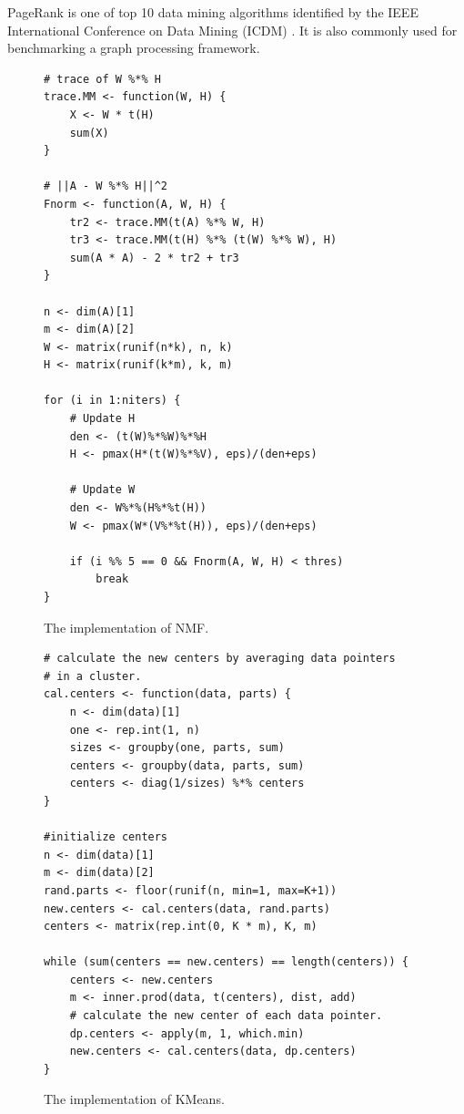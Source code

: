 PageRank is one of top 10 data mining algorithms identified by the IEEE
International Conference on Data Mining (ICDM) \cite{top10}. It is also
commonly used for benchmarking a graph processing framework.

\begin{figure}[t]
\begin{verbatim}
# trace of W %*% H
trace.MM <- function(W, H) {
	X <- W * t(H)
	sum(X)
}

# ||A - W %*% H||^2
Fnorm <- function(A, W, H) {
	tr2 <- trace.MM(t(A) %*% W, H)
	tr3 <- trace.MM(t(H) %*% (t(W) %*% W), H)
	sum(A * A) - 2 * tr2 + tr3
}

n <- dim(A)[1]
m <- dim(A)[2]
W <- matrix(runif(n*k), n, k)
H <- matrix(runif(k*m), k, m)

for (i in 1:niters) {
	# Update H
	den <- (t(W)%*%W)%*%H
	H <- pmax(H*(t(W)%*%V), eps)/(den+eps)

	# Update W
	den <- W%*%(H%*%t(H))
	W <- pmax(W*(V%*%t(H)), eps)/(den+eps)

	if (i %% 5 == 0 && Fnorm(A, W, H) < thres)
		break
}
\end{verbatim}
\vspace{-5pt}
\caption{The implementation of NMF.}
\label{fig:pma}
\end{figure}

\begin{figure}[t]
\begin{verbatim}
# calculate the new centers by averaging data pointers
# in a cluster.
cal.centers <- function(data, parts) {
	n <- dim(data)[1]
	one <- rep.int(1, n)
	sizes <- groupby(one, parts, sum)
	centers <- groupby(data, parts, sum)
	centers <- diag(1/sizes) %*% centers
}

#initialize centers
n <- dim(data)[1]
m <- dim(data)[2]
rand.parts <- floor(runif(n, min=1, max=K+1))
new.centers <- cal.centers(data, rand.parts)
centers <- matrix(rep.int(0, K * m), K, m)

while (sum(centers == new.centers) == length(centers)) {
	centers <- new.centers
	m <- inner.prod(data, t(centers), dist, add)
	# calculate the new center of each data pointer.
	dp.centers <- apply(m, 1, which.min)
	new.centers <- cal.centers(data, dp.centers)
}
\end{verbatim}
\vspace{-5pt}
\caption{The implementation of KMeans.}
\label{fig:kmeans}
\end{figure}


